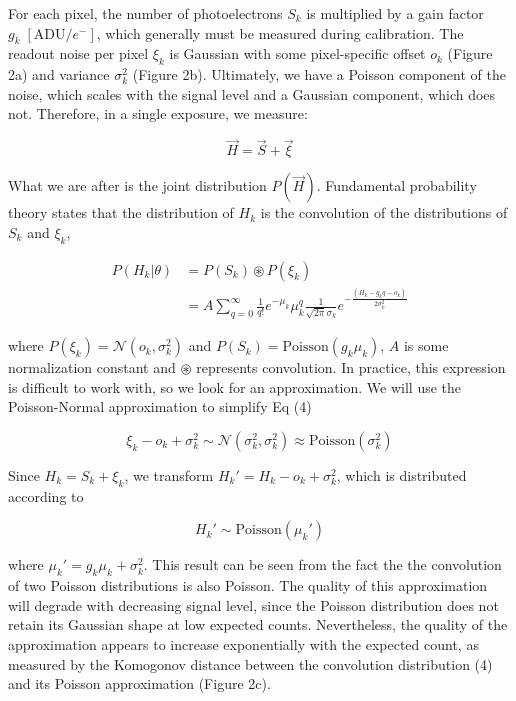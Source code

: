 \documentclass{ucetd}
\begin{document}
For each pixel, the number of photoelectrons $S_{k}$ is  multiplied by a gain factor $g_{k} \;[\mathrm{ADU}/e^{-}]$, which generally must be measured during calibration. The readout noise per pixel $\xi_{k}$ is Gaussian with some pixel-specific offset $o_{k}$ (Figure 2a) and variance $\sigma_{k}^{2}$ (Figure 2b). Ultimately, we have a Poisson component of the noise, which scales with the signal level and a Gaussian component, which does not. Therefore, in a single exposure, we measure: 

\begin{equation}
\vec{H} = \vec{S} + \vec{\xi}
\end{equation}

What we are after is the joint distribution $P(\vec{H})$. Fundamental probability theory states that the distribution of $H_{k}$ is the convolution of the distributions of $S_{k}$ and $\xi_{k}$,

\begin{align}
P(H_{k}|\theta) &= P(S_{k})\circledast P(\xi_{k})\\
&= A\sum_{q=0}^{\infty} \frac{1}{q!}e^{-\mu_{k}}\mu_{k}^{q}\frac{1}{\sqrt{2\pi}\sigma_{k}}e^{-\frac{(H_{k}-g_{k}q-o_{k})}{2\sigma_{k}^{2}}}
\end{align}

where $P(\xi_{k}) = \mathcal{N}(o_{k},\sigma_{k}^{2})$ and $P(S_{k}) = \mathrm{Poisson}(g_{k}\mu_{k})$,  $A$ is some normalization constant and $\circledast$ represents convolution. In practice, this expression is difficult to work with, so we look for an approximation. We will use the Poisson-Normal approximation to simplify Eq (4)

\begin{equation*}
\xi_{k} - o_{k} + \sigma_{k}^{2} \sim \mathcal{N}(\sigma_{k}^{2},\sigma_{k}^{2}) \approx \mathrm{Poisson}(\sigma_{k}^{2})
\end{equation*}

Since $H_{k} = S_{k} + \xi_{k}$, we transform $H_{k}' = H_{k} - o_{k} + \sigma_{k}^{2}$, which is distributed according to 

\begin{equation*}
H_{k}' \sim \mathrm{Poisson}(\mu_{k}')
\end{equation*}

where $\mu_{k}' = g_{k}\mu_{k} + \sigma_{k}^{2}$. This result can be seen from the fact the the convolution of two Poisson distributions is also Poisson. The quality of this approximation will degrade with decreasing signal level, since the Poisson distribution does not retain its Gaussian shape at low expected counts. Nevertheless, the quality of the approximation appears to increase exponentially with the expected count, as measured by the Komogonov distance between the convolution distribution (4) and its Poisson approximation (Figure 2c).
\end{document}
